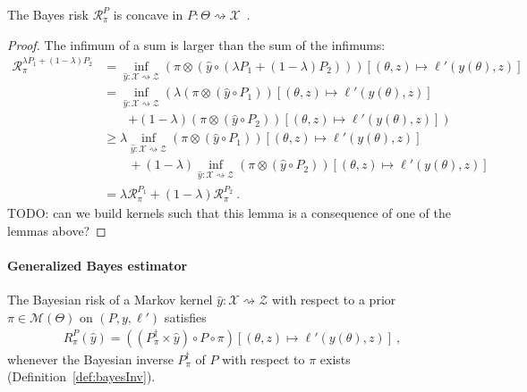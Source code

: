 \begin{lemma}
  \label{lem:bayesRisk_concave}
  The Bayes risk $\mathcal R_\pi^P$ is concave in $P : \Theta \rightsquigarrow \mathcal X$~.
\end{lemma}

\begin{proof}%
\uses{}
The infimum of a sum is larger than the sum of the infimums:
\begin{align*}
\mathcal R_\pi^{\lambda P_1 + (1 - \lambda)P_2}
&= \inf_{\hat{y} : \mathcal X \rightsquigarrow \mathcal Z} (\pi \otimes (\hat{y} \circ (\lambda P_1 + (1 - \lambda)P_2)))\left[(\theta, z) \mapsto \ell'(y(\theta), z)\right]
\\
&= \inf_{\hat{y} : \mathcal X \rightsquigarrow \mathcal Z}  \left( \lambda (\pi \otimes (\hat{y} \circ P_1))\left[(\theta, z) \mapsto \ell'(y(\theta), z)\right] \right.
  \\&\qquad \left. + (1 - \lambda) (\pi \otimes (\hat{y} \circ P_2))\left[(\theta, z) \mapsto \ell'(y(\theta), z)\right] \right)
\\
&\ge \lambda \inf_{\hat{y} : \mathcal X \rightsquigarrow \mathcal Z} (\pi \otimes (\hat{y} \circ P_1))\left[(\theta, z) \mapsto \ell'(y(\theta), z)\right]
  \\&\qquad + (1 - \lambda) \inf_{\hat{y} : \mathcal X \rightsquigarrow \mathcal Z} (\pi \otimes (\hat{y} \circ P_2))\left[(\theta, z) \mapsto \ell'(y(\theta), z)\right]
\\
&= \lambda \mathcal R_\pi^{P_1} + (1 - \lambda)\mathcal R_\pi^{P_2}
\: .
\end{align*}
TODO: can we build kernels such that this lemma is a consequence of one of the lemmas above?
\end{proof}



\paragraph{Generalized Bayes estimator}

\begin{lemma}
  \label{lem:bayesianRisk_bayesInv}
  \mathlibok
  The Bayesian risk of a Markov kernel $\hat{y} : \mathcal X \rightsquigarrow \mathcal Z$ with respect to a prior $\pi \in \mathcal M(\Theta)$ on $(P, y, \ell')$ satisfies
  \begin{align*}
  R^P_\pi(\hat{y}) = ((P_\pi^\dagger \times \hat{y}) \circ P \circ \pi)\left[(\theta, z) \mapsto \ell'(y(\theta), z)\right] \: ,
  \end{align*}
  whenever the Bayesian inverse $P_\pi^\dagger$ of $P$ with respect to $\pi$ exists (Definition~\ref{def:bayesInv}).
\end{lemma}

